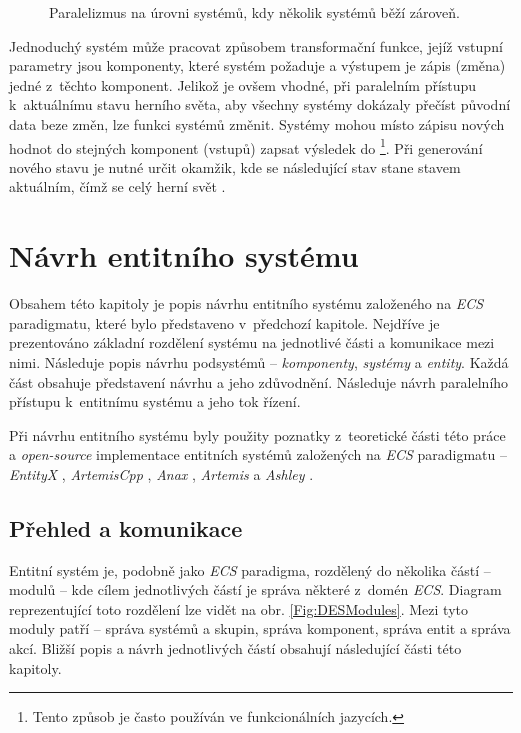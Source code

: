 \begin{figure}
	\caption{Paralelizmus na úrovni systémů, kdy několik systémů běží zároveň.}
	\label{Fig:PARSystem}
\end{figure}

Jednoduchý systém může pracovat způsobem transformační funkce, jejíž vstupní parametry jsou komponenty, které systém požaduje a výstupem je zápis (změna) jedné z~těchto komponent. Jelikož je ovšem vhodné, při paralelním přístupu k~aktuálnímu stavu herního světa, aby všechny systémy dokázaly přečíst původní data beze změn, lze funkci systémů změnit. Systémy mohou místo zápisu nových hodnot do stejných komponent (vstupů) zapsat výsledek do  \cite{FrontierThreads} \footnote{Tento způsob je často používán ve funkcionálních jazycích.}. Při generování nového stavu je nutné určit okamžik, kde se následující stav stane stavem aktuálním, čímž se celý herní svět .

\chapter{Návrh entitního systému}
\label{Chap:Design}

Obsahem této kapitoly je popis návrhu entitního systému založeného na \emph{ECS} paradigmatu, které bylo představeno v~předchozí kapitole. Nejdříve je prezentováno základní rozdělení systému na jednotlivé části a komunikace mezi nimi. Následuje popis návrhu podsystémů -- \emph{komponenty}, \emph{systémy} a \emph{entity}. Každá část obsahuje představení návrhu a jeho zdůvodnění. Následuje návrh paralelního přístupu k~entitnímu systému a jeho tok řízení.

Při návrhu entitního systému byly použity poznatky z~teoretické části této práce a \emph{open-source} implementace entitních systémů založených na \emph{ECS} paradigmatu -- \emph{EntityX} \cite{EntityX}, \emph{ArtemisCpp} \cite{ArtemisCpp}, \emph{Anax} \cite{Anax}, \emph{Artemis} \cite{ArtemisJava} a \emph{Ashley} \cite{Ashley}.

\section{Přehled a komunikace}

Entitní systém je, podobně jako \emph{ECS} paradigma, rozdělený do několika částí -- modulů -- kde cílem jednotlivých částí je správa některé z~domén \emph{ECS}. Diagram reprezentující toto rozdělení lze vidět na obr. \ref{Fig:DESModules}. Mezi tyto moduly patří -- správa systémů a skupin, správa komponent, správa entit a správa akcí. Bližší popis a návrh jednotlivých částí obsahují následující části této kapitoly.

